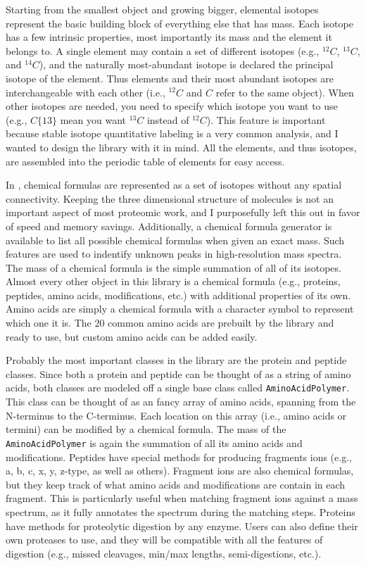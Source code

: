 Starting from the smallest object and growing bigger, elemental isotopes represent the basic building block of everything else that has mass. Each isotope has a few intrinsic properties, most importantly its mass and the element it belongs to. A single element may contain a set of different isotopes (e.g., $^{12}C$, $^{13}C$, and $^{14}C$), and the naturally most-abundant isotope is declared the principal isotope of the element. Thus elements and their most abundant isotopes are interchangeable with each other (i.e., $^{12}C$ and $C$ refer to the same object). When other isotopes are needed, you need to specify which isotope you want to use (e.g., $C\{13\}$ mean you want $^{13}C$ instead of $^{12}C$). This feature is important because stable isotope quantitative labeling is a very common analysis, and I wanted to design the library with it in mind. All the elements, and thus isotopes, are assembled into the periodic table of elements for easy access.

In \csmsl{}, chemical formulas are represented as a set of isotopes without any spatial connectivity. Keeping the three dimensional structure of molecules is not an important aspect of most proteomic work, and I purposefully left this out in favor of speed and memory savings. Additionally, a chemical formula generator is available to list all possible chemical formulas when given an exact mass. Such features are used to indentify unknown peaks in high-resolution mass spectra. The mass of a chemical formula is the simple summation of all of its isotopes. Almost every other object in this library is a chemical formula (e.g., proteins, peptides, amino acids, modifications, etc.)  with additional properties of its own. Amino acids are simply a chemical formula with a character symbol to represent which one it is. The 20 common amino acids are prebuilt by the library and ready to use, but custom amino acids can be added easily.

Probably the most important classes in the library are the protein and peptide classes. Since both a protein and peptide can be thought of as a string of amino acids, both classes are modeled off a single base class called \texttt{AminoAcidPolymer}. This class can be thought of as an fancy array of amino acids, spanning from the N-terminus to the C-terminus. Each location on this array (i.e., amino acids or termini) can be modified by a chemical formula. The mass of the \texttt{AminoAcidPolymer} is again the summation of all its amino acids and modifications. Peptides have special methods for producing fragments ions (e.g., a, b, c, x, y, z-type, as well as others). Fragment ions are also chemical formulas, but they keep track of what amino acids and modifications are contain in each fragment. This is particularly useful when matching fragment ions against a mass spectrum, as it fully annotates the spectrum during the matching steps. Proteins have methods for proteolytic digestion by any enzyme. Users can also define their own proteases to use, and they will be compatible with all the features of digestion (e.g., missed cleavages, min/max lengths, semi-digestions, etc.).

